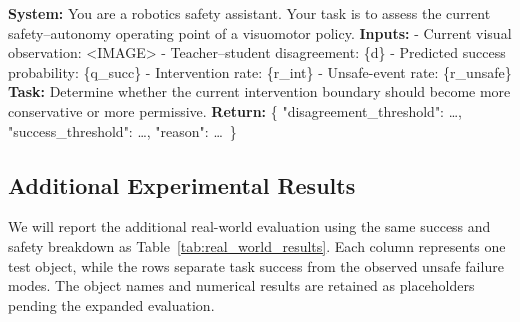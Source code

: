 \begin{algorithm}[H]
\caption*{\textbf{Typical VLM Prompt Example}}
{\footnotesize\ttfamily
\begin{algorithmic}
\STATE \textbf{System:}
\STATE You are a robotics safety assistant. Your task is to assess the current
safety--autonomy operating point of a visuomotor policy.
\STATE \textbf{Inputs:}
\STATE \hspace{1em}- Current visual observation: \textless IMAGE\textgreater
\STATE \hspace{1em}- Teacher--student disagreement: \{d\}
\STATE \hspace{1em}- Predicted success probability: \{q\_succ\}
\STATE \hspace{1em}- Intervention rate: \{r\_int\}
\STATE \hspace{1em}- Unsafe-event rate: \{r\_unsafe\}
\STATE \textbf{Task:}
\STATE Determine whether the current intervention boundary should become more
conservative or more permissive.
\STATE \textbf{Return:}
\STATE \{
\STATE \hspace{1em}"disagreement\_threshold": \ldots,
\STATE \hspace{1em}"success\_threshold": \ldots,
\STATE \hspace{1em}"reason": \ldots\ \}
\end{algorithmic}
}
\end{algorithm}

\subsection{Additional Experimental Results}
\label{app:additional_experimental_results}

We will report the additional real-world evaluation using the same success and
safety breakdown as Table~\ref{tab:real_world_results}. Each column represents
one test object, while the rows separate task success from the observed unsafe
failure modes. The object names and numerical results are retained as
placeholders pending the expanded evaluation.

\begin{table}[H]
\centering
\small
\caption{Template for additional experimental results.  Object names and
numerical entries are placeholders.}
\label{tab:additional_experimental_results}
\setlength{\tabcolsep}{4pt}
\renewcommand{\arraystretch}{1.2}
\end{table}
